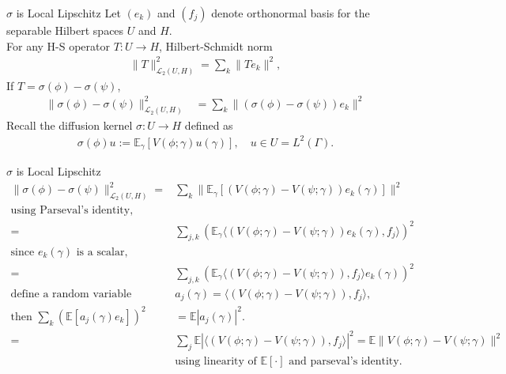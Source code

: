 \begin{frame}{$\sigma$ is Local Lipschitz}
    Let $(e_k)$ and $(f_j)$ denote orthonormal basis for the separable Hilbert spaces $U$ and $H$.\\
    For any H-S operator $T: U \rightarrow H$, Hilbert-Schmidt norm
    \begin{align*}
        \|T\|_{\mathcal{L}_2(U, H)}^2 = \sum_k \|Te_k\|^2,
    \end{align*}
    If $T = \sigma(\phi) - \sigma (\psi)$,
    \begin{align*}
        \| \sigma(\phi) - \sigma (\psi) \|_{\mathcal{L}_2(U, H)}^2 &= \sum_k \| (\sigma(\phi) - \sigma (\psi))e_k\|^2
    \end{align*}
    Recall the diffusion kernel $\sigma: U \rightarrow H$ defined as
    \begin{align*}
        \sigma(\phi)u := \mathbb{E}_{\gamma}[V(\phi; \gamma) u(\gamma)], \quad u \in U = L^2(\Gamma).
    \end{align*}
\end{frame}


\begin{frame}{$\sigma$ is Local Lipschitz}
    \begin{align*}
        \| \sigma(\phi) - \sigma (\psi) \|_{\mathcal{L}_2(U, H)}^2 =& \sum_k\|\mathbb{E}_{\gamma}[(V(\phi; \gamma) - V(\psi; \gamma)) e_k(\gamma)]\|^2\\
        \text{using Parseval's identity, } &\\
        =&\sum_{j,k} \left(\mathbb{E}_{\gamma} \langle (V(\phi; \gamma) - V(\psi; \gamma))e_k(\gamma), f_j\rangle\right)^2\\
        \text{since $e_k(\gamma)$ is a scalar},\quad &\\
        =&\sum_{j,k} \left(\mathbb{E}_{\gamma} \langle (V(\phi; \gamma) - V(\psi; \gamma)), f_j\rangle e_k(\gamma) \right)^2\\
        \text{define a random variable }& a_{j}(\gamma) = \langle (V(\phi; \gamma) - V(\psi; \gamma)), f_j\rangle,\\
        \text{then } \sum_k(\mathbb{E}[a_j(\gamma) e_k])^2 &= \mathbb{E}|a_j(\gamma)|^2.\\
        =& \sum_j \mathbb{E}|\langle (V(\phi; \gamma) - V(\psi; \gamma)), f_j\rangle|^2 = \mathbb{E} \|V(\phi; \gamma) - V(\psi; \gamma)\|^2\\
        &\text{using linearity of $\mathbb{E}[\cdot]$ and parseval's identity.}
    \end{align*}
\end{frame}


